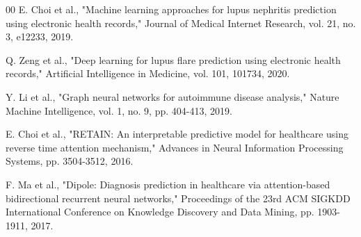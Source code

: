 \documentclass[conference]{IEEEtran}
\begin{document}
\begin{thebibliography}{00}
 E. Choi et al., "Machine learning approaches for lupus nephritis prediction using electronic health records," Journal of Medical Internet Research, vol. 21, no. 3, e12233, 2019.

 Q. Zeng et al., "Deep learning for lupus flare prediction using electronic health records," Artificial Intelligence in Medicine, vol. 101, 101734, 2020.

 Y. Li et al., "Graph neural networks for autoimmune disease analysis," Nature Machine Intelligence, vol. 1, no. 9, pp. 404-413, 2019.

 E. Choi et al., "RETAIN: An interpretable predictive model for healthcare using reverse time attention mechanism," Advances in Neural Information Processing Systems, pp. 3504-3512, 2016.

 F. Ma et al., "Dipole: Diagnosis prediction in healthcare via attention-based bidirectional recurrent neural networks," Proceedings of the 23rd ACM SIGKDD International Conference on Knowledge Discovery and Data Mining, pp. 1903-1911, 2017.

\end{thebibliography}
\end{document}
